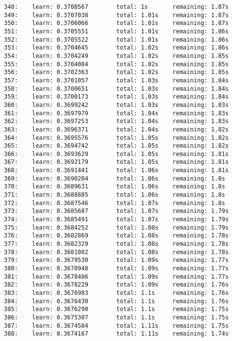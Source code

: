 \documentclass[11pt]{article}
\begin{document}
\begin{Verbatim}[commandchars=\\\{\}]
348:    learn: 0.3708567        total: 1s       remaining: 1.87s
349:    learn: 0.3707038        total: 1.01s    remaining: 1.87s
350:    learn: 0.3706066        total: 1.01s    remaining: 1.87s
351:    learn: 0.3705551        total: 1.01s    remaining: 1.86s
352:    learn: 0.3705522        total: 1.01s    remaining: 1.86s
353:    learn: 0.3704645        total: 1.02s    remaining: 1.86s
354:    learn: 0.3704249        total: 1.02s    remaining: 1.85s
355:    learn: 0.3704084        total: 1.02s    remaining: 1.85s
356:    learn: 0.3702363        total: 1.02s    remaining: 1.85s
357:    learn: 0.3701057        total: 1.03s    remaining: 1.84s
358:    learn: 0.3700651        total: 1.03s    remaining: 1.84s
359:    learn: 0.3700173        total: 1.03s    remaining: 1.84s
360:    learn: 0.3699242        total: 1.03s    remaining: 1.83s
361:    learn: 0.3697979        total: 1.04s    remaining: 1.83s
362:    learn: 0.3697253        total: 1.04s    remaining: 1.83s
363:    learn: 0.3696371        total: 1.04s    remaining: 1.82s
364:    learn: 0.3695576        total: 1.05s    remaining: 1.82s
365:    learn: 0.3694742        total: 1.05s    remaining: 1.82s
366:    learn: 0.3693629        total: 1.05s    remaining: 1.81s
367:    learn: 0.3692179        total: 1.05s    remaining: 1.81s
368:    learn: 0.3691441        total: 1.06s    remaining: 1.81s
369:    learn: 0.3690204        total: 1.06s    remaining: 1.8s
370:    learn: 0.3689631        total: 1.06s    remaining: 1.8s
371:    learn: 0.3688885        total: 1.06s    remaining: 1.8s
372:    learn: 0.3687546        total: 1.07s    remaining: 1.8s
373:    learn: 0.3685687        total: 1.07s    remaining: 1.79s
374:    learn: 0.3685491        total: 1.07s    remaining: 1.79s
375:    learn: 0.3684252        total: 1.08s    remaining: 1.79s
376:    learn: 0.3682869        total: 1.08s    remaining: 1.78s
377:    learn: 0.3682329        total: 1.08s    remaining: 1.78s
378:    learn: 0.3681082        total: 1.08s    remaining: 1.78s
379:    learn: 0.3679530        total: 1.09s    remaining: 1.77s
380:    learn: 0.3678948        total: 1.09s    remaining: 1.77s
381:    learn: 0.3678486        total: 1.09s    remaining: 1.77s
382:    learn: 0.3678229        total: 1.09s    remaining: 1.76s
383:    learn: 0.3676983        total: 1.1s     remaining: 1.76s
384:    learn: 0.3676430        total: 1.1s     remaining: 1.76s
385:    learn: 0.3676290        total: 1.1s     remaining: 1.75s
386:    learn: 0.3675307        total: 1.1s     remaining: 1.75s
387:    learn: 0.3674584        total: 1.11s    remaining: 1.75s
388:    learn: 0.3674167        total: 1.11s    remaining: 1.74s

\end{Verbatim}
\end{document}
